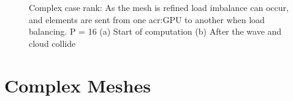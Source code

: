 \begin{figure}[H]
	\centering
	\hfill
	\caption{Complex case rank: As the mesh is refined load imbalance can occur, and elements are sent from one \acrshort{acr:GPU} to another when load balancing. P = 16 (a) Start of computation (b) After the wave and cloud collide}\label{fig:cloud_rank}
\end{figure}

\section{Complex Meshes}\label{section:results:complex_meshes}


